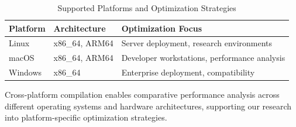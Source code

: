 \begin{table}[ht]
\centering
\begin{tabular}{@{}lll@{}}
\toprule
\textbf{Platform} & \textbf{Architecture} & \textbf{Optimization Focus} \\
\midrule
Linux & x86\_64, ARM64 & Server deployment, research environments \\
macOS & x86\_64, ARM64 & Developer workstations, performance analysis \\
Windows & x86\_64 & Enterprise deployment, compatibility \\
\bottomrule
\end{tabular}
\caption{Supported Platforms and Optimization Strategies}
\end{table}

Cross-platform compilation enables comparative performance analysis across different operating systems and hardware architectures, supporting our research into platform-specific optimization strategies.
